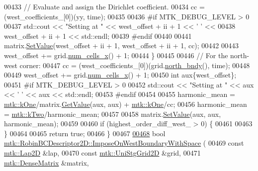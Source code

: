 \begin{DoxyCode}
00433     \textcolor{comment}{// Evaluate and assign the Dirichlet coefficient.}
00434     cc = (west\_coefficients\_[0])(yy, time);
00435 
00436 \textcolor{preprocessor}{    #if MTK\_DEBUG\_LEVEL > 0}
00437     std::cout << \textcolor{stringliteral}{"Setting at "} << west\_offset + ii + 1 << \textcolor{charliteral}{' '} <<
00438       west\_offset + ii + 1 << std::endl;
00439 \textcolor{preprocessor}{    #endif}
00440 
00441     matrix.\hyperlink{classmtk_1_1DenseMatrix_a784ce5784109ac86bfb9d8562b334b13}{SetValue}(west\_offset + ii + 1, west\_offset + ii + 1, cc);
00442 
00443     west\_offset += grid.\hyperlink{classmtk_1_1UniStgGrid2D_a2d182866a398aba8e4829590e85bf939}{num\_cells\_x}() + 1;
00444   \}
00445 
00446   \textcolor{comment}{// For the north-west corner:}
00447   cc = (west\_coefficients\_[0])(grid.\hyperlink{classmtk_1_1UniStgGrid2D_afe1ead253cdeb5503e0489eba8fd84e2}{north\_bndy}(), time);
00448 
00449   west\_offset += grid.\hyperlink{classmtk_1_1UniStgGrid2D_a2d182866a398aba8e4829590e85bf939}{num\_cells\_x}() + 1;
00450   \textcolor{keywordtype}{int} aux\{west\_offset\};
00451 \textcolor{preprocessor}{  #if MTK\_DEBUG\_LEVEL > 0}
00452   std::cout << \textcolor{stringliteral}{"Setting at "} << aux << \textcolor{charliteral}{' '} << aux << std::endl;
00453 \textcolor{preprocessor}{  #endif}
00454 
00455   harmonic\_mean = \hyperlink{group__c01-roots_ga26407c24d43b6b95480943340d285c71}{mtk::kOne}/matrix.\hyperlink{classmtk_1_1DenseMatrix_a4b23ecbebd970b5eea915dbb50691024}{GetValue}(aux, aux) + 
      \hyperlink{group__c01-roots_ga26407c24d43b6b95480943340d285c71}{mtk::kOne}/cc;
00456   harmonic\_mean = \hyperlink{group__c01-roots_gaf39c2d851a2db744f4feb1c5ab3ec2cf}{mtk::kTwo}/harmonic\_mean;
00457 
00458   matrix.\hyperlink{classmtk_1_1DenseMatrix_a784ce5784109ac86bfb9d8562b334b13}{SetValue}(aux, aux, harmonic\_mean);
00459 
00460   \textcolor{keywordflow}{if} (highest\_order\_diff\_west\_ > 0) \{
00461 
00463   \}
00464 
00465   \textcolor{keywordflow}{return} \textcolor{keyword}{true};
00466 \}
00467 
\hypertarget{mtk__robin__bc__descriptor__2d_8cc_source_l00468}{}\hyperlink{classmtk_1_1RobinBCDescriptor2D_adbfdfa9c6b93df8d23c50686b5b356ef}{00468} \textcolor{keywordtype}{bool} \hyperlink{classmtk_1_1RobinBCDescriptor2D_adbfdfa9c6b93df8d23c50686b5b356ef}{mtk::RobinBCDescriptor2D::ImposeOnWestBoundaryWithSpace}
      (
00469     \textcolor{keyword}{const} \hyperlink{classmtk_1_1Lap2D}{mtk::Lap2D} &lap,
00470     \textcolor{keyword}{const} \hyperlink{classmtk_1_1UniStgGrid2D}{mtk::UniStgGrid2D} &grid,
00471     \hyperlink{classmtk_1_1DenseMatrix}{mtk::DenseMatrix} &matrix,

\end{DoxyCode}
